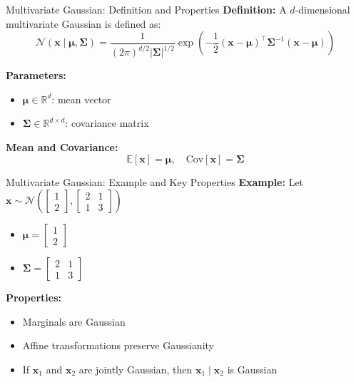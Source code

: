 \documentclass{beamer}
\begin{document}
\begin{frame}{Multivariate Gaussian: Definition and Properties}
\textbf{Definition:} A $d$-dimensional multivariate Gaussian is defined as:
\[
\mathcal{N}(\mathbf{x} \mid \boldsymbol{\mu}, \boldsymbol{\Sigma}) =
\frac{1}{(2\pi)^{d/2} |\boldsymbol{\Sigma}|^{1/2}}
\exp\left( -\frac{1}{2} (\mathbf{x} - \boldsymbol{\mu})^\top \boldsymbol{\Sigma}^{-1} (\mathbf{x} - \boldsymbol{\mu}) \right)
\]

\textbf{Parameters:}
\begin{itemize}
  \item $\boldsymbol{\mu} \in \mathbb{R}^d$: mean vector
  \item $\boldsymbol{\Sigma} \in \mathbb{R}^{d \times d}$: covariance matrix
\end{itemize}

\textbf{Mean and Covariance:}
\[
\mathbb{E}[\mathbf{x}] = \boldsymbol{\mu}, \quad \text{Cov}[\mathbf{x}] = \boldsymbol{\Sigma}
\]
\end{frame}

\begin{frame}{Multivariate Gaussian: Example and Key Properties}
\textbf{Example:} Let $\mathbf{x} \sim \mathcal{N} \left(
\begin{bmatrix} 1 \\ 2 \end{bmatrix},
\begin{bmatrix} 2 & 1 \\ 1 & 3 \end{bmatrix}
\right)$

\begin{itemize}
  \item $\boldsymbol{\mu} = \begin{bmatrix} 1 \\ 2 \end{bmatrix}$
  \item $\boldsymbol{\Sigma} = \begin{bmatrix} 2 & 1 \\ 1 & 3 \end{bmatrix}$
\end{itemize}

\vspace{0.5em}
\textbf{Properties:}
\begin{itemize}
  \item Marginals are Gaussian
  \item Affine transformations preserve Gaussianity
  \item If $\mathbf{x}_1$ and $\mathbf{x}_2$ are jointly Gaussian, then $\mathbf{x}_1 \mid \mathbf{x}_2$ is Gaussian
\end{itemize}
\end{frame}
\end{document}
